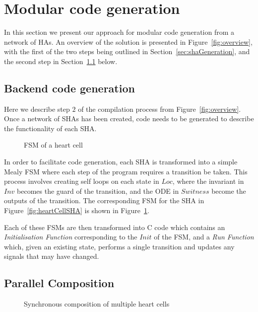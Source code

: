 \section{Modular code generation}
\label{sec:codeGen}

In this section we present our approach for modular code generation from a network of \acp{HA}. 
An overview of the solution is presented in Figure~\ref{fig:overview}, with the first of the two steps being outlined in Section~\ref{sec:shaGeneration}, and the second step in Section~\ref{sec:backendCodeGeneration} below.



\subsection{Backend code generation}
\label{sec:backendCodeGeneration}

Here we describe step $2$ of the compilation process from Figure~\ref{fig:overview}.
Once a network of \acp{SHA} has been created, code needs to be generated to describe the functionality of each \ac{SHA}.

\begin{figure}
	\centering
	
	\caption{\acf{FSM} of a heart cell \label{fig:heartCellFSM}}
\end{figure}

In order to facilitate code generation, each \ac{SHA} is transformed into a simple Mealy \ac{FSM} where each step of the program requires a transition be taken.
This process involves creating self loops on each state in $Loc$, where the invariant in $Inv$ becomes the guard of the transition, and the \acs{ODE} in $Switness$ become the outputs of the transition.
The corresponding \ac{FSM} for the \ac{SHA} in Figure~\ref{fig:heartCellSHA} is shown in Figure~\ref{fig:heartCellFSM}.

Each of these \acp{FSM} are then transformed into C code which contains an \emph{Initialisation Function} corresponding to the $Init$ of the \ac{FSM}, and a \emph{Run Function} which, given an existing state, performs a single transition and updates any signals that may have changed.


\subsection{Parallel Composition}
\label{sec:composition}

\begin{figure}
	\centering
	
	\caption{Synchronous composition of multiple heart cells \label{fig:heartCellComposition}}
\end{figure}


